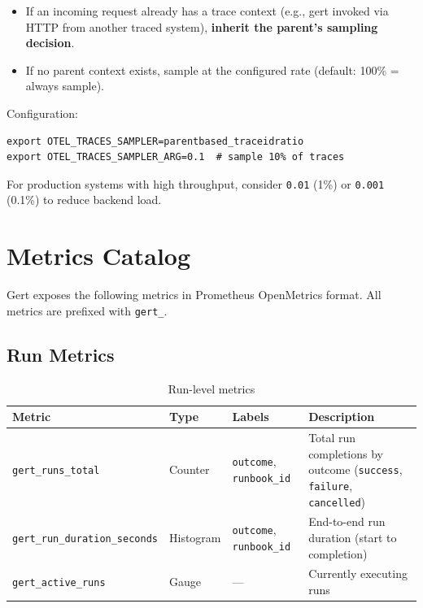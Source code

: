 \begin{itemize}
  \item If an incoming request already has a trace context (e.g., gert invoked via HTTP from another traced system), \textbf{inherit the parent's sampling decision}.
  \item If no parent context exists, sample at the configured rate (default: 100\% = always sample).
\end{itemize}

Configuration:

\begin{verbatim}
export OTEL_TRACES_SAMPLER=parentbased_traceidratio
export OTEL_TRACES_SAMPLER_ARG=0.1  # sample 10% of traces
\end{verbatim}

For production systems with high throughput, consider \texttt{0.01} (1\%) or \texttt{0.001} (0.1\%) to reduce backend load.

\section{Metrics Catalog}

Gert exposes the following metrics in Prometheus OpenMetrics format. All metrics are prefixed with \texttt{gert\_}.

\subsection{Run Metrics}

\begin{table}[h]
\centering
\begin{tabular}{|p{4.5cm}|p{1.5cm}|p{3.5cm}|p{5.5cm}|}
\hline
\textbf{Metric} & \textbf{Type} & \textbf{Labels} & \textbf{Description} \\
\hline
\texttt{gert\_runs\_total} & Counter & \texttt{outcome}, \texttt{runbook\_id} & Total run completions by outcome (\texttt{success}, \texttt{failure}, \texttt{cancelled}) \\
\hline
\texttt{gert\_run\_duration\_seconds} & Histogram & \texttt{outcome}, \texttt{runbook\_id} & End-to-end run duration (start to completion) \\
\hline
\texttt{gert\_active\_runs} & Gauge & — & Currently executing runs \\
\hline
\end{tabular}
\caption{Run-level metrics}
\end{table}

